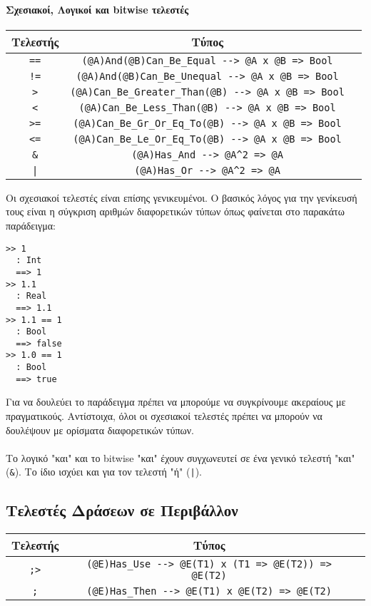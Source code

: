 \documentclass[diploma]{softlab-thesis}
\begin{document}
\paragraph{Σχεσιακοί, Λογικοί και bitwise τελεστές}

\begin{center}
\begin{tabular}{ |c|c|c| }
\hline
Τελεστής & Τύπος
\\
\hline
\hline
\verb|==| & \verb|(@A)And(@B)Can_Be_Equal --> @A x @B => Bool|
\\
\hline
\verb|!=| & \verb|(@A)And(@B)Can_Be_Unequal --> @A x @B => Bool|
\\
\hline
\verb|>| & \verb|(@A)Can_Be_Greater_Than(@B) --> @A x @B => Bool|
\\
\hline
\verb|<| & \verb|(@A)Can_Be_Less_Than(@B) --> @A x @B => Bool|
\\
\hline
\verb|>=| & \verb|(@A)Can_Be_Gr_Or_Eq_To(@B) --> @A x @B => Bool|
\\
\hline
\verb|<=| & \verb|(@A)Can_Be_Le_Or_Eq_To(@B) --> @A x @B => Bool|
\\
\hline
\verb|&| & \verb|(@A)Has_And --> @A^2 => @A|
\\
\hline
\texttt{|} & \verb|(@A)Has_Or --> @A^2 => @A|
\\
\hline
\end{tabular}
\end{center}
Οι σχεσιακοί τελεστές είναι επίσης γενικευμένοι. Ο βασικός λόγος για την
γενίκευσή τους είναι η σύγκριση αριθμών διαφορετικών τύπων όπως φαίνεται στο
παρακάτω παράδειγμα:
\begin{verbatim}
>> 1
  : Int
  ==> 1
>> 1.1
  : Real
  ==> 1.1
>> 1.1 == 1
  : Bool
  ==> false
>> 1.0 == 1
  : Bool
  ==> true
\end{verbatim}
Για να δουλεύει το παράδειγμα πρέπει να μπορούμε να συγκρίνουμε ακεραίους με
πραγματικούς.  Αντίστοιχα, όλοι οι σχεσιακοί τελεστές πρέπει να μπορούν να
δουλέψουν με ορίσματα διαφορετικών τύπων.
\\\\
Το λογικό "και" και το bitwise "και" έχουν συγχωνευτεί σε ένα γενικό
τελεστή "και" (\verb|&|). Το ίδιο ισχύει και για τον τελεστή "ή" (\texttt{|}).

\newpage
\subsection{Τελεστές Δράσεων σε Περιβάλλον}

\begin{center}
\begin{tabular}{ |c|c|c| }
\hline
Τελεστής & Τύπος
\\
\hline
\hline
\verb|;>| & \verb|(@E)Has_Use --> @E(T1) x (T1 => @E(T2)) => @E(T2)|
\\
\hline
\verb|;| & \verb|(@E)Has_Then --> @E(T1) x @E(T2) => @E(T2)|
\\
\hline
\end{tabular}
\end{center}
\end{document}
